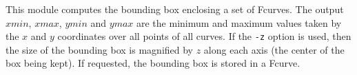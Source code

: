 This module computes the bounding box enclosing a set of Fcurves. The output
$xmin$, $xmax$, $ymin$ and $ymax$ are the minimum and maximum
values taken by the $x$ and $y$ coordinates over all points of all curves.
If the \verb+-z+ option is used, then the size of the bounding box is 
magnified by $z$ along each axis (the center of the box being kept). 
If requested, the bounding box is stored in a Fcurve.

